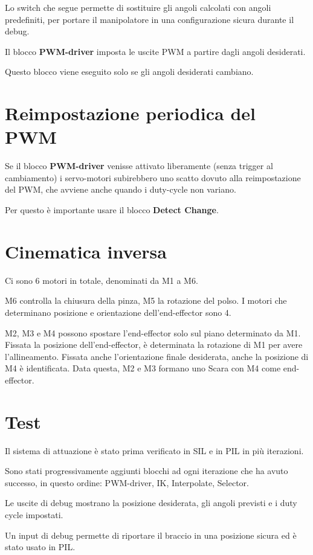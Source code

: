 \documentclass[12pt]{report}
\begin{document}
Lo switch che segue permette di sostituire gli angoli calcolati con angoli predefiniti, per portare il manipolatore in una configurazione sicura durante il debug.

Il blocco \textbf{PWM-driver} imposta le uscite PWM a partire dagli angoli desiderati.

Questo blocco viene eseguito solo se gli angoli desiderati cambiano.

\section{Reimpostazione periodica del PWM}

Se il blocco \textbf{PWM-driver} venisse attivato liberamente (senza trigger al cambiamento) i servo-motori subirebbero uno scatto dovuto alla reimpostazione del PWM, che avviene anche quando i duty-cycle non variano.

Per questo è importante usare il blocco \textbf{Detect Change}. 

\section{Cinematica inversa}

Ci sono 6 motori in totale, denominati da M1 a M6.

M6 controlla la chiusura della pinza, M5 la rotazione del polso. I motori che determinano posizione e orientazione dell'end-effector sono 4.

M2, M3 e M4 possono spostare l'end-effector solo sul piano determinato da M1. Fissata la posizione dell'end-effector, è determinata la rotazione di M1 per avere l'allineamento. Fissata anche l'orientazione finale desiderata, anche la posizione di M4 è identificata. Data questa, M2 e M3 formano uno Scara con M4 come end-effector.

\section{Test}

Il sistema di attuazione è stato prima verificato in SIL e in PIL in più iterazioni.

Sono stati progressivamente aggiunti blocchi ad ogni iterazione che ha avuto successo, in questo ordine: PWM-driver, IK, Interpolate, Selector.

Le uscite di debug mostrano la posizione desiderata, gli angoli previsti e i duty cycle impostati.

Un input di debug permette di riportare il braccio in una posizione sicura ed è stato usato in PIL.
\end{document}
